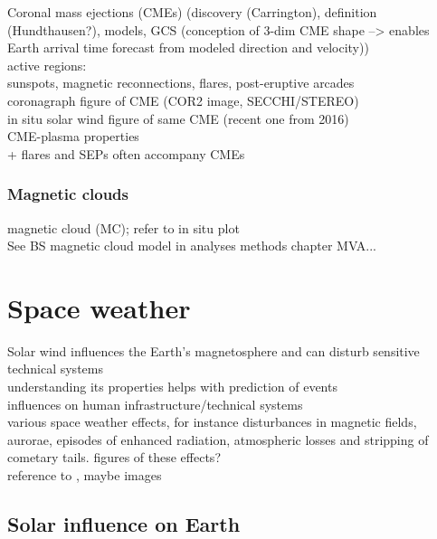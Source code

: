 Coronal mass ejections (CMEs) (discovery (Carrington), definition (Hundthausen?), models, GCS (conception of 3-dim CME shape --> enables Earth arrival time forecast from modeled direction and velocity))\\

active regions:\\
sunspots, magnetic reconnections, flares, post-eruptive arcades\\

coronagraph figure of CME (COR2 image, SECCHI/STEREO)\\
in situ solar wind figure of same CME (recent one from 2016)\\

CME-plasma properties\\
+ flares and SEPs often accompany CMEs\\

\subsubsection{Magnetic clouds}
magnetic cloud (MC); refer to in situ plot\\
See BS magnetic cloud model in analyses methods chapter
MVA...\\


\section{Space weather}
\label{sec:space_weather}

Solar wind influences the Earth's magnetosphere and can disturb sensitive technical systems\\
understanding its properties helps with prediction of events\\

influences on human infrastructure/technical systems\\

various space weather effects, for instance disturbances in magnetic fields, aurorae, episodes of enhanced radiation, atmospheric losses and stripping of cometary tails. figures of these effects?\\

reference to \citet{Bothmer2007}, maybe images\\

\subsection{Solar influence on Earth}
\label{sec:solar_influence_on_earth}

